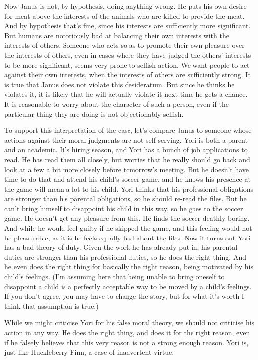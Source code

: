 Now \gls{Janus} is not, by hypothesis, doing anything wrong. He puts his own desire for meat above the interests of the animals who are killed to provide the meat. And by hypothesis that's fine, since his interests are sufficiently more significant. But humans are notoriously bad at balancing their own interests with the interests of others. Someone who acts so as to promote their own pleasure over the interests of others, even in cases where they have judged the others' interests to be more significant, seems very prone to selfish action. We want people to act against their own interests, when the interests of others are sufficiently strong. It is true that \gls{Janus} does not violate this desideratum. But since he thinks he violates it, it is likely that he will actually violate it next time he gets a chance. It is reasonable to worry about the character of such a person, even if the particular thing they are doing is not objectionably selfish.

To support this interpretation of the case, let's compare \gls{Janus} to someone whose actions against their moral judgments are not self-serving. \gls{Yori} is both a parent and an academic. It's hiring season, and \gls{Yori} has a bunch of job applications to read. He has read them all closely, but worries that he really should go back and look at a few a bit more closely before tomorrow's meeting. But he doesn't have time to do that and attend his child's soccer game, and he knows his presence at the game will mean a lot to his child. \gls{Yori} thinks that his professional obligations are stronger than his parental obligations, so he should re-read the files. But he can't bring himself to disappoint his child in this way, so he goes to the soccer game. He doesn't get any pleasure from this. He finds the soccer deathly boring. And while he would feel guilty if he skipped the game, and this feeling would not be pleasurable, as it is he feels equally bad about the files. Now it turns out \gls{Yori} has a bad theory of duty. Given the work he has already put in, his parental duties are stronger than his professional duties, so he does the right thing. And he even does the right thing for basically the right reason, being motivated by his child's feelings. (I'm assuming here that being unable to bring oneself to disappoint a child is a perfectly acceptable way to be moved by a child's feelings. If you don't agree, you may have to change the story, but for what it's worth I think that assumption is true.)

While we might criticise \gls{Yori} for his false moral theory, we should not criticise his action in any way. He does the right thing, and does it for the right reason, even if he falsely believes that this very reason is not a strong enough reason. \gls{Yori} is, just like \gls{Huck}leberry Finn, a case of inadvertent virtue.


